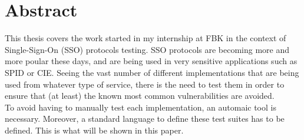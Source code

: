 \chapter*{Abstract} %
\label{abstract}


This thesis covers the work started in my internship at FBK in the context of Single-Sign-On (SSO) protocols testing.
SSO protocols are becoming more and more poular these days, and are being used in very sensitive applications such as SPID or CIE. Seeing the vast number of different implementations that are being used from whatever type of service, there is the need to test them in order to ensure that (at least) the known most common vulnerabilities are avoided.\\ 
To avoid having to manually test each implementation, an automaic tool is necessary. Moreover, a standard language to define these test suites has to be defined.
This is what will be shown in this paper.
